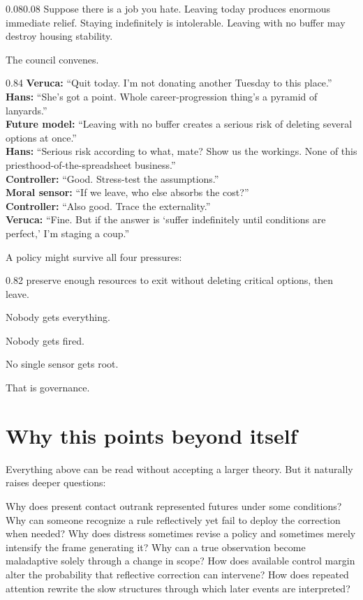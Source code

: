 \documentclass[10pt,letterpaper]{article}
\newenvironment{paperbody}
  {\begin{adjustwidth}{0.08\textwidth}{0.08\textwidth}\justifying}
  {\par\end{adjustwidth}}
\newenvironment{voicebox}
  {\Needspace{3.5\baselineskip}\par\vspace{0.22em}\begin{center}\begingroup
   \begin{lrbox}{\voiceboxsave}\begin{varwidth}{0.82\linewidth}
   \small\rmfamily\upshape\RaggedRight}
  {\end{varwidth}\end{lrbox}\fbox{\usebox{\voiceboxsave}}
   \endgroup\end{center}\vspace{0.22em}}
\newenvironment{dialoguebox}
  {\Needspace{5\baselineskip}\par\vspace{0.26em}\begin{center}\begingroup
   \begin{lrbox}{\dialogueboxsave}\begin{varwidth}{0.84\linewidth}
   \small\rmfamily\upshape\RaggedRight}
  {\end{varwidth}\end{lrbox}\fbox{\usebox{\dialogueboxsave}}
   \endgroup\end{center}\vspace{0.26em}}
\let\oldsection\section
\renewcommand{\section}{\Needspace{6\baselineskip}\oldsection}
\begin{document}
\begin{paperbody}
Suppose there is a job you hate. Leaving today produces enormous
immediate relief. Staying indefinitely is intolerable. Leaving with no
buffer may destroy housing stability.

The council convenes.

\begin{dialoguebox}
\textbf{Veruca:} ``Quit today. I'm not donating another Tuesday to this
place.''\\[0.35em]
\textbf{Hans:} ``She's got a point. Whole career-progression thing's a
pyramid of lanyards.''\\[0.35em]
\textbf{Future model:} ``Leaving with no buffer creates a serious risk
of deleting several options at once.''\\[0.35em]
\textbf{Hans:} ``Serious risk according to what, mate? Show us the
workings. None of this priesthood-of-the-spreadsheet business.''\\[0.35em]
\textbf{Controller:} ``Good. Stress-test the assumptions.''\\[0.35em]
\textbf{Moral sensor:} ``If we leave, who else absorbs the cost?''\\[0.35em]
\textbf{Controller:} ``Also good. Trace the externality.''\\[0.35em]
\textbf{Veruca:} ``Fine. But if the answer is `suffer indefinitely until
conditions are perfect,' I'm staging a coup.''
\end{dialoguebox}

A policy might survive all four pressures:

\begin{voicebox}
preserve enough resources to exit without deleting critical options,
then leave.
\end{voicebox}

Nobody gets everything.

Nobody gets fired.

No single sensor gets root.

That is governance.

\section{Why this points beyond
itself}\label{why-this-points-beyond-itself}

Everything above can be read without accepting a larger theory. But it
naturally raises deeper questions:

Why does present contact outrank represented futures under some
conditions? Why can someone recognize a rule reflectively yet fail to
deploy the correction when needed? Why does distress sometimes revise a
policy and sometimes merely intensify the frame generating it? Why can a
true observation become maladaptive solely through a change in scope?
How does available control margin alter the probability that reflective
correction can intervene? How does repeated attention rewrite the slow
structures through which later events are interpreted?


\end{paperbody}
\end{document}
